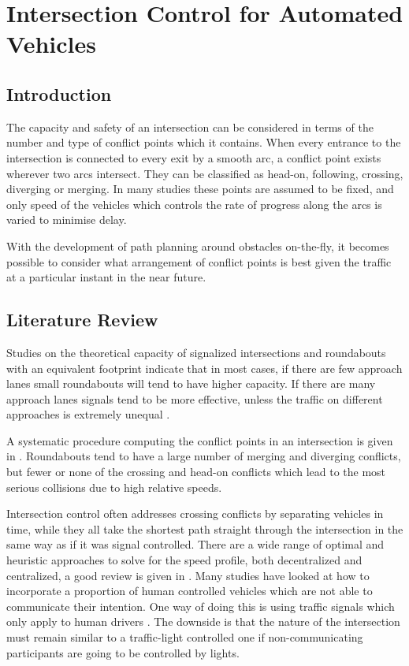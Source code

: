 
\chapter{Intersection Control for Automated Vehicles }
\section{Introduction}
The capacity and safety of an intersection can be considered in terms of the number and type of conflict points which it contains. When every entrance to the intersection is connected to every exit by a smooth arc, a conflict point exists wherever two arcs intersect. They can be classified as head-on, following, crossing, diverging or merging. In many studies these points are assumed to be fixed, and only speed of the vehicles which controls the rate of progress along the arcs is varied to minimise delay. 

With the development of path planning around obstacles on-the-fly, it becomes possible to consider what arrangement of conflict points is best given the traffic at a particular instant in the near future. 

\section{Literature Review} 
Studies on the theoretical capacity of signalized intersections and roundabouts with an equivalent footprint indicate that in most cases, if there are few approach lanes small roundabouts will tend to have higher capacity. If there are many approach lanes signals tend to be more effective, unless the traffic on different approaches is extremely unequal \cite{Jian-an2001}. 

A systematic procedure computing the conflict points in an intersection is given in \cite{Lu2013}. Roundabouts tend to have a large number of merging and diverging conflicts, but fewer or none of the crossing and head-on conflicts which lead to the most serious collisions due to high relative speeds.

Intersection control often addresses crossing conflicts by separating vehicles in time, while they all take the shortest path straight through the intersection in the same way as if it was signal controlled. There are a wide range of optimal and heuristic approaches to solve for the speed profile, both decentralized and centralized, a good review is given in \cite{Rios-Torres2017}. Many studies have looked at how to incorporate a proportion of human controlled vehicles which are not able to communicate their intention. One way of doing this is using traffic signals which only apply to human drivers \cite{Zhao2019}. The downside is that the nature of the intersection must remain similar to a traffic-light controlled one if non-communicating participants are going to be controlled by lights.

